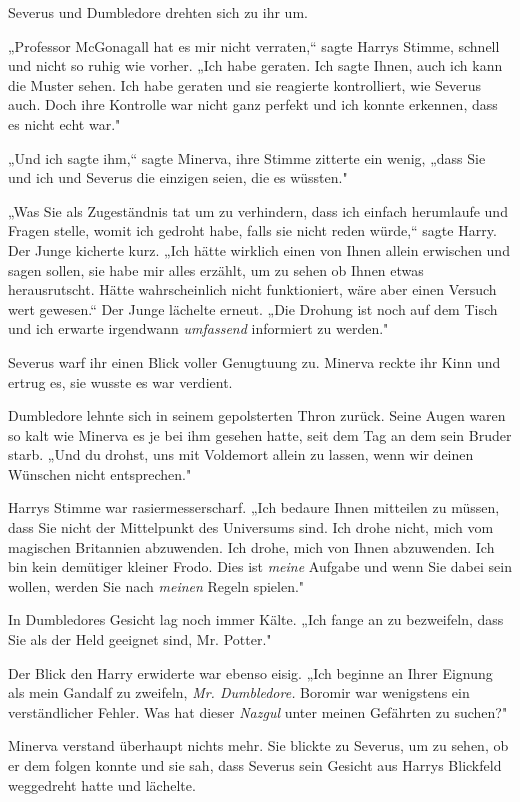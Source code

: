 {Severus und Dumbledore drehten sich zu ihr um.

„Professor McGonagall hat es mir nicht verraten,“ sagte Harrys Stimme, schnell und nicht so ruhig wie vorher. „Ich habe geraten. Ich sagte Ihnen, auch ich kann die Muster sehen. Ich habe geraten und sie reagierte kontrolliert, wie Severus auch. Doch ihre Kontrolle war nicht ganz perfekt und ich konnte erkennen, dass es nicht echt war."

„Und ich sagte ihm,“ sagte Minerva, ihre Stimme zitterte ein wenig, „dass Sie und ich und Severus die einzigen seien, die es wüssten."

„Was Sie als Zugeständnis tat um zu verhindern, dass ich einfach herumlaufe und Fragen stelle, womit ich gedroht habe, falls sie nicht reden würde,“ sagte Harry. Der Junge kicherte kurz. „Ich hätte wirklich einen von Ihnen allein erwischen und sagen sollen, sie habe mir alles erzählt, um zu sehen ob Ihnen etwas herausrutscht. Hätte wahrscheinlich nicht funktioniert, wäre aber einen Versuch wert gewesen.“ Der Junge lächelte erneut. „Die Drohung ist noch auf dem Tisch und ich erwarte irgendwann \emph{umfassend} informiert zu werden."

Severus warf ihr einen Blick voller Genugtuung zu. Minerva reckte ihr Kinn und ertrug es, sie wusste es war verdient.

Dumbledore lehnte sich in seinem gepolsterten Thron zurück. Seine Augen waren so kalt wie Minerva es je bei ihm gesehen hatte, seit dem Tag an dem sein Bruder starb. „Und du drohst, uns mit Voldemort allein zu lassen, wenn wir deinen Wünschen nicht entsprechen."

Harrys Stimme war rasiermesserscharf. „Ich bedaure Ihnen mitteilen zu müssen, dass Sie nicht der Mittelpunkt des Universums sind. Ich drohe nicht, mich vom magischen Britannien abzuwenden. Ich drohe, mich von Ihnen abzuwenden. Ich bin kein demütiger kleiner Frodo. Dies ist \emph{meine} Aufgabe und wenn Sie dabei sein wollen, werden Sie nach \emph{meinen} Regeln spielen."

In Dumbledores Gesicht lag noch immer Kälte. „Ich fange an zu bezweifeln, dass Sie als der Held geeignet sind, Mr. Potter."

Der Blick den Harry erwiderte war ebenso eisig. „Ich beginne an Ihrer Eignung als mein Gandalf zu zweifeln, \emph{Mr. Dumbledore.} Boromir war wenigstens ein verständlicher Fehler. Was hat dieser \emph{Nazgul} unter meinen Gefährten zu suchen?"

Minerva verstand überhaupt nichts mehr. Sie blickte zu Severus, um zu sehen, ob er dem folgen konnte und sie sah, dass Severus sein Gesicht aus Harrys Blickfeld weggedreht hatte und lächelte.

}
